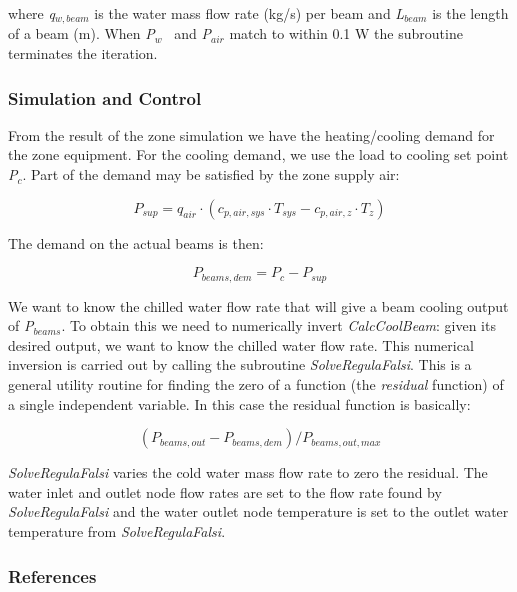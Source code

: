 where \emph{q\(_{w,beam}\)} is the water mass flow rate (kg/s) per beam and \emph{L\(_{beam}\)} is the length of a beam (m). When \emph{P}\(_{w}\) ~and \emph{P\(_{air}\)} match to within 0.1 W the subroutine terminates the iteration.

\subsubsection{Simulation and Control}\label{simulation-and-control-4}

From the result of the zone simulation we have the heating/cooling demand for the zone equipment. For the cooling demand, we use the load to cooling set point \emph{P\(_{c}\)}. Part of the demand may be satisfied by the zone supply air:

\begin{equation}
P_{sup} = q_{air}·(c_{p,air,sys}·T_{sys} - c_{p,air,z}·T_{z})
\end{equation}

The demand on the actual beams is then:

\begin{equation}
P_{beams,dem} = P_{c} - P_{sup}
\end{equation}

We want to know the chilled water flow rate that will give a beam cooling output of \emph{P\(_{beams}\)}. To obtain this we need to numerically invert \emph{CalcCoolBeam}: given its desired output, we want to know the chilled water flow rate. This numerical inversion is carried out by calling the subroutine \emph{SolveRegulaFalsi}. This is a general utility routine for finding the zero of a function (the \emph{residual} function) of a single independent variable. In this case the residual function is basically:

\begin{equation}
(P_{beams,out}-P_{beams,dem})/P_{beams,out,max}
\end{equation}

\emph{SolveRegulaFalsi} varies the cold water mass flow rate to zero the residual. The water inlet and outlet node flow rates are set to the flow rate found by \emph{SolveRegulaFalsi} and the water outlet node temperature is set to the outlet water temperature from \emph{SolveRegulaFalsi}.

\subsubsection{References}\label{references-4}

